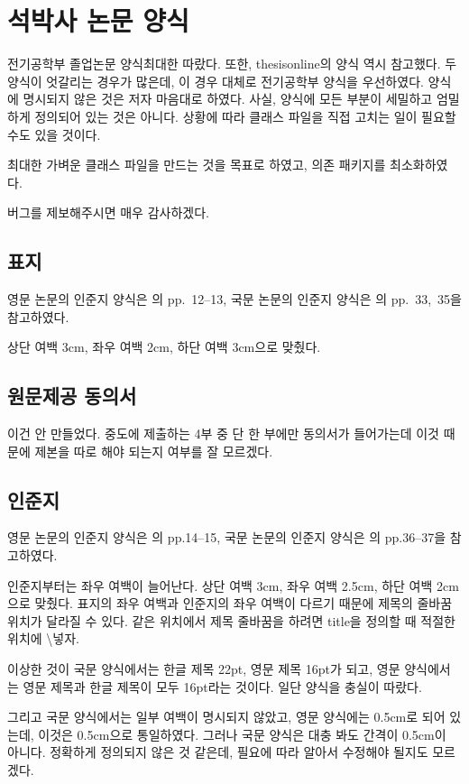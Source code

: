 \documentclass[a4paper]{report}
\begin{document}
\chapter{석박사 논문 양식}

전기공학부 졸업논문 양식\cite{under,grad}\을 최대한 따랐다.
또한, thesisonline의 양식 역시 참고했다.
두 양식이 엇갈리는 경우가 많은데,
이 경우 대체로 전기공학부 양식을 우선하였다.
양식에 명시되지 않은 것은 저자 마음대로 하였다.
사실, 양식에 모든 부분이 세밀하고 엄밀하게
정의되어 있는 것은 아니다.
상황에 따라 클래스 파일을 직접 고치는 일이
필요할 수도 있을 것이다.

최대한 가벼운 클래스 파일을 만드는 것을
목표로 하였고, 의존 패키지를 최소화하였다.

버그를 제보해주시면 매우 감사하겠다.

\section{표지}
영문 논문의 인준지 양식은 \cite{grad}의 pp.~12--13,
국문 논문의 인준지 양식은 \cite{grad}의 pp.~33,~35을 참고하였다.

상단 여백 3cm, 좌우 여백 2cm, 하단 여백 3cm으로 맞췄다.

\section{원문제공 동의서}
이건 안 만들었다. 중도에 제출하는 4부 중 단 한 부에만
동의서가 들어가는데 이것 때문에 제본을 따로 해야
되는지 여부를 잘 모르겠다.

\section{인준지}
영문 논문의 인준지 양식은 \cite{grad}의 pp.14--15,
국문 논문의 인준지 양식은 \cite{grad}의 pp.36--37을 참고하였다.

인준지부터는 좌우 여백이 늘어난다.
상단 여백 3cm, 좌우 여백 2.5cm, 하단 여백 2cm으로 맞췄다.
표지의 좌우 여백과 인준지의 좌우 여백이 다르기 때문에
제목의 줄바꿈 위치가 달라질 수 있다.
같은 위치에서 제목 줄바꿈을 하려면 title을 정의할 때
적절한 위치에 \textbackslash{} 넣자.

이상한 것이 국문 양식에서는 한글 제목 22pt, 영문 제목 16pt가 되고,
영문 양식에서는 영문 제목과 한글 제목이 모두 16pt라는 것이다.
일단 양식을 충실이 따랐다.

그리고 국문 양식에서는 일부 여백이 명시되지 않았고,
영문 양식에는 0.5cm로 되어 있는데, 이것은 0.5cm으로 통일하였다.
그러나 국문 양식은 대충 봐도 간격이 0.5cm이 아니다.
정확하게 정의되지 않은 것 같은데, 필요에 따라
알아서 수정해야 될지도 모르겠다.
\end{document}
